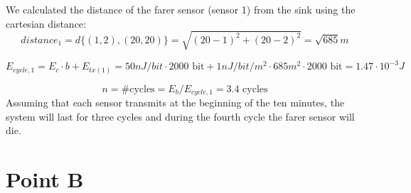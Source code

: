 We calculated the distance of the farer sensor (sensor 1) from the sink using the cartesian distance: \[ distance_1 = d \{(1, 2) , (20, 20)\} = \sqrt{(20-1)^2 + (20-2)^2} = \sqrt{685} m \]

\[
E_{cycle, 1} = E_c \cdot b + E_{tx(1)} = 50 nJ/bit \cdot 2000 \text{ bit} + 1 nJ/bit/m^2 \cdot 685 m^2 \cdot 2000 \text{ bit} = 1.47 \cdot 10^{-3} J
\]

\[
n = \text{\# cycles} = E_b / E_{cycle, 1} = 3.4 \text{ cycles}
\]
Assuming that each sensor transmits at the beginning of the ten minutes, the system will last for three cycles and during the fourth cycle the farer sensor will die.

\section{Point B}









